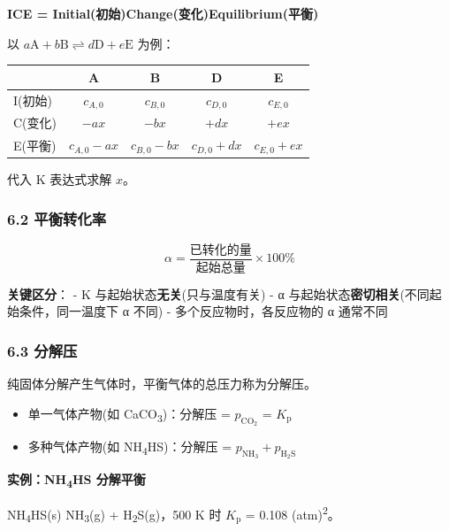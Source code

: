 \textbf{ICE = Initial(初始)\箭 Change(变化)\箭 Equilibrium(平衡)}

以 \(a\mathrm{A} + b\mathrm{B} \rightleftharpoons d\mathrm{D} + e\mathrm{E}\) 为例：

{\def\LTcaptype{none} %
\begin{longtable}[]{@{}lcccc@{}}
\toprule\noalign{}
& A & B & D & E \\
\midrule\noalign{}
\endhead
\bottomrule\noalign{}
\endlastfoot
I(初始) & \(c_{A,0}\) & \(c_{B,0}\) & \(c_{D,0}\) & \(c_{E,0}\) \\
C(变化) & \(-ax\) & \(-bx\) & \(+dx\) & \(+ex\) \\
E(平衡) & \(c_{A,0}-ax\) & \(c_{B,0}-bx\) & \(c_{D,0}+dx\) & \(c_{E,0}+ex\) \\
\end{longtable}
}

代入 K 表达式求解 \(x\)。

\subsubsection{6.2 平衡转化率}\label{ux5e73ux8861ux8f6cux5316ux7387}

\[
\alpha = \frac{\text{已转化的量}}{\text{起始总量}} \times 100\%
\]

\textbf{关键区分}：
- K 与起始状态\textbf{无关}(只与温度有关)
- α 与起始状态\textbf{密切相关}(不同起始条件，同一温度下 α 不同)
- 多个反应物时，各反应物的 α 通常不同

\subsubsection{6.3 分解压}\label{ux5206ux89e3ux538b}

纯固体分解产生气体时，平衡气体的总压力称为分解压。

\begin{itemize}
\tightlist
\item
  单一气体产物(如 CaCO\textsubscript{3})：分解压 = \(p_{\mathrm{CO_2}}\) = \(K_{\mathrm p}\)
\item
  多种气体产物(如 NH\textsubscript{4}HS)：分解压 = \(p_{\mathrm{NH_3}} + p_{\mathrm{H_2S}}\)
\end{itemize}

\textbf{实例：NH\textsubscript{4}HS 分解平衡}

NH\textsubscript{4}HS(s) \衡 NH\textsubscript{3}(g) + H\textsubscript{2}S(g)，500 K 时 \(K_{\mathrm p}\) = 0.108 (atm)\textsuperscript{2}。

